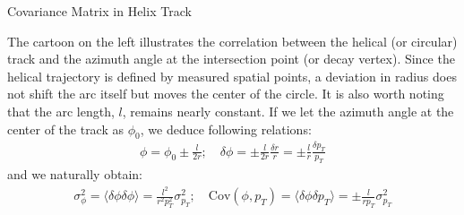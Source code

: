 \documentclass[
	xcolor=dvipsnames,
	10pt, 
	]{beamer}
\begin{document}
\fi
\begin{frame}{Covariance Matrix in Helix Track}
	\begin{block}{}
{
	The cartoon on the left illustrates the correlation between the helical (or circular) track and the azimuth angle at the intersection point (or decay vertex). Since the helical trajectory is defined by measured spatial points, a deviation in radius does not shift the arc itself but moves the center of the circle. It is also worth noting that the arc length, $l$, remains nearly constant. 
}
If we let the azimuth angle at the center of the track as $\phi_0$, we deduce following relations:
\vspace{-4 mm}
\begin{align}
	\phi = \phi_0 \pm \frac{l}{2r};\quad  \delta\phi = \pm\frac{l}{2r}\frac{\delta r}{r}= \pm\frac{l}{r}\frac{\delta p_T}{p_T}
\end{align}
\vspace{-2 mm}
and we naturally obtain:
\vspace{-2 mm}
\begin{align}
	\sigma_{\phi}^2 = \langle\delta\phi\delta\phi\rangle=\frac{l^2}{r^2p_{T}^2}\sigma^2_{p_T};\quad \textrm{Cov}(\phi,p_T)= \langle\delta\phi\delta p_T \rangle = \pm \frac{l}{rp_T}\sigma_{p_T}^2
\end{align}
\end{block}
\end{frame}
\end{document}
